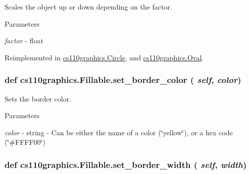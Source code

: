 Scales the object up or down depending on the factor. 
\begin{DoxyParams}{Parameters}
\item[{\em factor}]-\/ float \end{DoxyParams}


Reimplemented in \hyperlink{classcs110graphics_1_1Circle_a9ffed9eb3f191fafadd5b2d7e7735c18}{cs110graphics.Circle}, and \hyperlink{classcs110graphics_1_1Oval_accf5ef95d1127e0abe9f09823051d75f}{cs110graphics.Oval}.\hypertarget{classcs110graphics_1_1Fillable_a2f830be5d970faac97759910d20d68a4}{
\subsubsection[{set\_\-border\_\-color}]{\setlength{\rightskip}{0pt plus 5cm}def cs110graphics.Fillable.set\_\-border\_\-color ( {\em self}, \/   {\em color})}}
\label{classcs110graphics_1_1Fillable_a2f830be5d970faac97759910d20d68a4}


Sets the border color. 
\begin{DoxyParams}{Parameters}
\item[{\em color}]-\/ string -\/ Can be either the name of a color (\char`\"{}yellow\char`\"{}), or a hex code (\char`\"{}\#FFFF00\char`\"{}) \end{DoxyParams}
\hypertarget{classcs110graphics_1_1Fillable_a09f05462cb2ed38fdccb244340f05b2b}{
\subsubsection[{set\_\-border\_\-width}]{\setlength{\rightskip}{0pt plus 5cm}def cs110graphics.Fillable.set\_\-border\_\-width ( {\em self}, \/   {\em width})}}
\label{classcs110graphics_1_1Fillable_a09f05462cb2ed38fdccb244340f05b2b}



